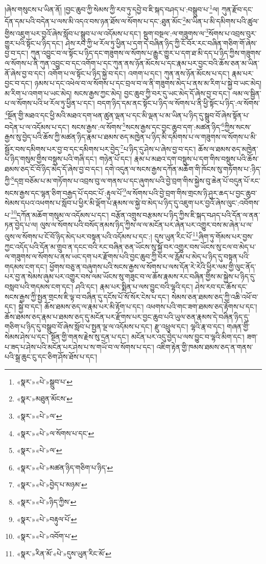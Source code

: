 །ཞེས་གསུངས་པ་ཡིན་ནོ། །བྱང་ཆུབ་ཀྱི་སེམས་ཀྱི་རབ་ཏུ་དབྱེ་བ་ཇི་སྐད་བཤད་པ་:བསྒྲུབ་པ་\footnote{«སྣར་»«པེ་»སྒྲུབ་པ་}ལ། ཀུན་རྫོབ་དང་དོན་དམ་པའི་བདེན་པ་ལས་མི་འདའ་བས་ཉན་ཐོས་ལ་སོགས་པ་དང་:ཐུན་མོང་\footnote{«སྣར་»མཐུན་མོངས་}མ་ཡིན་པ་མི་དམིགས་པའི་ཚུལ་གྱིས་འཇུག་པར་བྱའོ་ཞེས་སློབ་པ་སྒྲུབ་པ་ལ་འདོམས་པ་དང་། སྡུག་བསྔལ་:ལ་གཟུགས་ལ་\footnote{«སྣར་»«པེ་»ལ་}སོགས་པ་འབྲས་བུར་གྱུར་པའི་སྟོང་པ་ཉིད་དང་། ཤེས་རབ་ཀྱི་ཕ་རོལ་ཏུ་ཕྱིན་པ་དག་དེ་བཞིན་ཉིད་ཀྱི་ངོ་བོར་རང་བཞིན་གཅིག་གོ་ཞེས་བྱ་བ་དང་། ཀུན་འབྱུང་བ་ལ་སྟོང་པ་ཉིད་དང་གཟུགས་ལ་སོགས་པ་རྒྱུར་གྱུར་པ་དག་ཐ་མི་དད་པ་ཉིད་ཀྱིས་གཟུགས་ལ་སོགས་པ་ནི་ཀུན་འབྱུང་བ་དང་འགོག་པ་དང་ཀུན་ནས་ཉོན་མོངས་པ་དང་རྣམ་པར་བྱང་བའི་ཆོས་ཅན་མ་ཡིན་ནོ་ཞེས་བྱ་བ་དང་། འགོག་པ་ལ་སྟོང་པ་ཉིད་སྐྱེ་བ་དང་། འགག་པ་དང་། ཀུན་ནས་ཉོན་མོངས་པ་དང་། རྣམ་པར་བྱང་བ་དང་། ཉམས་པ་དང་འཕེལ་བ་ལ་སོགས་པ་དང་བྲལ་བ་ལ་ནི་གཟུགས་མེད་པ་ནས་མ་རིག་པ་སྐྱེ་བ་ཡང་མེད། མ་རིག་པ་འགག་པ་ཡང་མེད། སངས་རྒྱས་ཀྱང་མེད། བྱང་ཆུབ་ཀྱི་བར་དུ་ཡང་མེད་དོ་ཞེས་བྱ་བ་དང་། ལམ་ལ་སྦྱིན་པ་ལ་སོགས་པའི་ཕ་རོལ་ཏུ་ཕྱིན་པ་དང་། བདག་ཉིད་དམ་ནང་སྟོང་པ་ཉིད་ལ་སོགས་པ་ནི་ཕྱི་སྟོང་པ་ཉིད་:ལ་སོགས་\footnote{«སྣར་»«པེ་»ལ་སོགས་པ་དང་}སྔོན་གྱི་མཐའ་དང་ཕྱི་མའི་མཐའ་དག་ཕན་ཚུན་ལྡན་པ་དང་མི་ལྡན་པ་མ་ཡིན་པ་ཉིད་དུ་སྒྲུབ་བོ་ཞེས་སྟོན་པ་བདེན་པ་ལ་འདོམས་པ་དང་། སངས་རྒྱས་:ལ་སོགས་\footnote{«སྣར་»«པེ་»ལ་}སངས་རྒྱས་དང་བྱང་ཆུབ་དག་:མཚན་ཉིད་\footnote{«སྣར་»«པེ་»མཚན་ཉིད་གཅིག་པ་ཉིད་}ཀྱིས་སངས་རྒྱས་སུ་བྱེད་པའི་ཆོས་ཀྱི་མཚན་ཉིད་རྣམ་པ་ཐམས་ཅད་མཁྱེན་པ་ཉིད་མི་དམིགས་པ་ལ་གཟུགས་ལ་སོགས་པ་མི་སྦྱོར་བས་དམིགས་པར་བྱ་བ་དང་དམིགས་པར་བྱེད་\footnote{«སྣར་»«པེ་»བྱེད་པ་མཉམ་}པ་ཉིད་དུ་ཤེས་པ་ཞེས་བྱ་བ་དང་། ཆོས་ལ་ཐམས་ཅད་མཁྱེན་པ་ཉིད་གསུམ་གྱིས་བསྡུས་པའི་གཞི་དང་། གཉེན་པོ་དང་། རྣམ་པ་མཐའ་དག་བསྡུས་པ་དག་གིས་བསྡུས་པའི་ཆོས་ཐམས་ཅད་ངོ་བོ་ཉིད་མེད་དོ་ཞེས་བྱ་བ་དང་། དགེ་འདུན་ལ་སངས་རྒྱས་དཀོན་མཆོག་གི་ཁོངས་སུ་གཏོགས་པ་:ཉིད་ཀྱི་\footnote{«སྣར་»«པེ་»ཉིད་ཀྱིས་}དགྲ་བཅོམ་པ་མ་གཏོགས་པ་འབྲས་བུ་ལ་གནས་པ་དང་ཞུགས་པའི་བྱེ་བྲག་གིས་སྐྱེས་བུ་ཆེན་པོ་བདུན་པོ་རང་སངས་རྒྱས་དང་ལྷན་ཅིག་བརྒྱད་པོ་དབང་པོ་:རྟུལ་པོ་\footnote{«སྣར་»«པེ་»བརྟུལ་པོ་}ལ་སོགས་པའི་བྱེ་བྲག་གིས་གྲངས་ཉི་ཤུར་ཆད་པ་བྱང་ཆུབ་སེམས་དཔའ་འཕགས་པ་སློབ་པ་ཕྱིར་མི་ལྡོག་པ་རྣམས་ལ་སྐྱེ་བ་མེད་པ་ཉིད་དུ་འཇུག་པར་བྱའོ་ཞེས་ལུང་:འབོགས་པ་\footnote{«སྣར་»«པེ་»འབོག་པ་}དཀོན་མཆོག་གསུམ་ལ་འདོམས་པ་དང་། བརྩོན་འགྲུས་བརྩམས་པ་ཉིད་ཀྱིས་ཇི་སྐད་བཤད་པའི་དོན་ལ་ནན་ཏན་བྱེད་པ་ལ། ལུས་ལ་སོགས་པའི་བསོད་ནམས་ཉིད་ཀྱིས་ལ་ལ་མངོན་པར་ཞེན་པར་འགྱུར་བས་མ་ཞེན་པ་ལ་ལུས་ལ་སོགས་པ་ངོ་བོ་ཉིད་མེད་པར་བསྟན་པའི་འདོམས་པ་དང་:། དུས་ཡུན་རིང་པོ་\footnote{«སྣར་»རིན་མོ་«པེ་»དུས་ཡུན་རིང་མོ་}ཞིག་ཏུ་གོམས་པར་བྱས་ཀྱང་འདོད་པའི་དོན་མ་གྲུབ་ན་དངང་བའི་རང་བཞིན་ཅན་ཡོངས་སུ་སྐྱོ་བར་འགྱུར་བས་ཡོངས་སུ་ངལ་བ་མེད་པ་ལ་གཟུགས་ལ་སོགས་པ་ནས་ཡང་དག་པར་རྫོགས་པའི་བྱང་ཆུབ་ཀྱི་བར་ལ་རློམ་པ་མེད་པ་ཉིད་དུ་བསྟན་པའི་གདམས་ངག་དང་། ཕྱོགས་བཅུ་ན་བཞུགས་པའི་སངས་རྒྱས་ལ་སོགས་པ་ལས་དོན་རེ་རེའི་ཕྱིར་ལམ་གྱི་ལུང་ནོད་པར་བྱ་ན་སེམས་ཞུམ་པར་འགྱུར་བས་ལམ་ཡོངས་སུ་གཟུང་བ་ལ་ཆོས་རྣམས་རང་བཞིན་གྱིས་མ་སྐྱེས་པ་ཉིད་དུ་བསླབ་པའི་གདམས་ངག་དང་། ཤའི་དང་། རྣམ་པར་སྨིན་པ་ལས་བྱུང་བའི་ལྷའི་དང་། ཤེས་རབ་དང་ཆོས་དང་སངས་རྒྱས་ཀྱི་སྤྱན་གྲངས་ཇི་ལྟ་བ་བཞིན་དུ་དངོས་པོ་སོ་སོར་ངེས་པ་དང་། སེམས་ཅན་ཐམས་ཅད་ཀྱི་འཆི་འཕོ་བ་དང་། སྐྱེ་བ་དང་། ཆོས་ཐམས་ཅད་ལ་རྣམ་པར་མི་རྟོག་པ་དང་། འཕགས་པའི་གང་ཟག་ཐམས་ཅད་རྟོགས་པ་དང་། ཆོས་ཐམས་ཅད་རྣམ་པ་ཐམས་ཅད་དུ་མངོན་པར་རྫོགས་པར་བྱང་ཆུབ་པའི་ཡུལ་ཅན་རྣམས་དེ་བཞིན་ཉིད་དུ་གཅིག་པ་ཉིད་དུ་བསྒྲུབ་བོ་ཞེས་སློབ་པ་སྤྱན་ལྔ་ལ་འདོམས་པ་དང་། རྫུ་འཕྲུལ་དང་། ལྷའི་རྣ་བ་དང་། གཞན་གྱི་སེམས་ཤེས་པ་དང་། སྔོན་གྱི་གནས་རྗེས་སུ་དྲན་པ་དང་། མངོན་པར་འདུ་བྱེད་པ་ལས་བྱུང་བ་ལྷའི་མིག་དང་། ཟག་པ་ཟད་པ་ཤེས་པའི་མངོན་པར་ཤེས་པ་ས་གཡོ་བ་ལ་སོགས་པ་དང་། འཇིག་རྟེན་གྱི་ཁམས་ཐམས་ཅད་ན་གནས་པའི་སྒྲ་ཆུང་ངུ་དང་ཅིག་ཤོས་ཐོས་པ་དང་། 